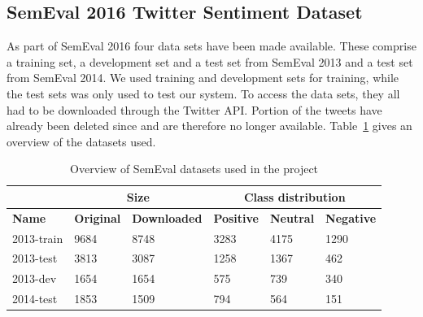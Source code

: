 \subsection{SemEval 2016 Twitter Sentiment Dataset}
As part of SemEval 2016 four data sets have been made available. These comprise a training set, a development set and a test set from SemEval 2013 and a test set from SemEval 2014. We used training and development sets for training, while the test sets was only used to test our system. To access the data sets, they all had to be downloaded through the Twitter API. Portion of the tweets have already been deleted since and are therefore no longer available. Table~\ref{tab:dataset_overview} gives an overview of the datasets used.

\noindent\begin{table}[ht]
    \begin{tabular}{| l | l | l | l | l | l |}
        \hline
         & \multicolumn{2}{c|}{\textbf{Size}} & \multicolumn{3}{c|}{\textbf{Class distribution}} \\ \hline
        \textbf{Name} & \textbf{Original} & \textbf{Downloaded} & \textbf{Positive} & \textbf{Neutral} & \textbf{Negative} \\ \hline
        2013-train & 9684 & 8748 & 3283 & 4175 & 1290 \\ \hline
        2013-test & 3813 & 3087 & 1258 & 1367 & 462 \\ \hline
        2013-dev & 1654 & 1654 & 575 & 739 & 340 \\ \hline
        2014-test & 1853 & 1509 & 794 & 564 & 151 \\ \hline
    \end{tabular}
    \caption{Overview of SemEval datasets used in the project}
    \label{tab:dataset_overview}
\end{table}

\glsresetall

